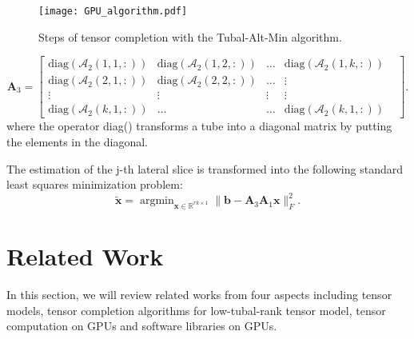 \documentclass[format=acmsmall, review=false, screen=true]{acmart}
\begin{document}
\begin{figure}[t]
    \centering
    \texttt{[image: GPU\_algorithm.pdf]}
    \caption{Steps of tensor completion with the Tubal-Alt-Min algorithm.}
    \label{pic_gpu_algorithm}
\end{figure}

\[
\mathbf{A}_3 =
\begin{bmatrix}
    \mathrm{diag}(\mathcal{A}_2(1, 1, :)) & \mathrm{diag}(\mathcal{A}_2(1, 2, :)) & \ldots & \mathrm{diag}(\mathcal{A}_2(1, k, :)) \\
    \mathrm{diag}(\mathcal{A}_2(2, 1, :)) & \mathrm{diag}(\mathcal{A}_2(2, 2, :)) & \ldots & \vdots \\
    \vdots & \vdots & \vdots & \vdots & \\
    \mathrm{diag}(\mathcal{A}_2(k, 1, :)) & \ldots &\dots & \mathrm{diag}(\mathcal{A}_2(k, 1, :))
\end{bmatrix} .
\]
where the operator diag() transforms a tube into a diagonal matrix by putting the elements in the diagonal. \par
The estimation of the j-th lateral slice is transformed into the following standard least squares minimization problem:
\[
\widetilde{\mathbf{x}} = \mathop{\arg \min}_{\mathbf{x} \in
\mathbb{R}^{rk \times 1}} \| \mathbf{b} - \mathbf{A}_3\mathbf{A}_1 \mathbf{x} \|^2_F.
\]

\section{Related Work}
In this section, we will review related works from four aspects including tensor models, tensor completion algorithms for low-tubal-rank tensor model, tensor computation on GPUs and software libraries on GPUs.
\end{document}
